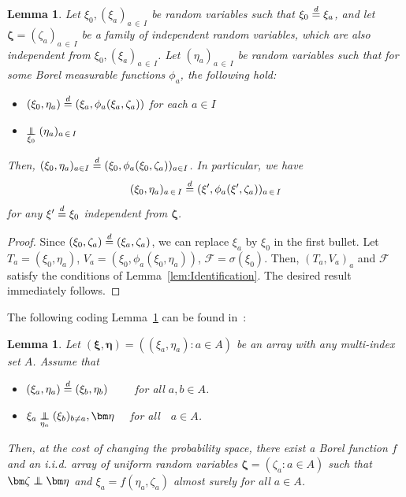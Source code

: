 \documentclass[10pt]{amsart}
\newtheorem{lemm}[theo]{Lemma}\newtheorem{prop}[theo]{Proposition}\newtheorem{coro}[theo]{Corollary}\newtheorem{conj}[theo]{Conjecture}
\theoremstyle{definition}\newtheorem{defi}[theo]{Definition}\newtheorem{rema}[theo]{Remark}\newtheorem{exam}[theo]{Example}\newtheorem{exem}[theo]{Example}\newtheorem{nota}[theo]{Notation}
\newcommand{\independent}{\protect\mathpalette{\protect\independenT}{\perp}}\def\independenT#1#2{\mathrel{\rlap{$#1#2$}\mkern2mu{#1#2}}}
\renewcommand{\d}{\buildrel{d}\over{=}}
\newcommand*\FF{\mathcal{F}}
\begin{document}
\begin{lemm}\label{lem:joining}
Let $\xi_0, (\xi_a)_{a\,\in\,I}$ be random variables such that $\xi_0 \d \xi_a$, and let\linebreak$\bm{\zeta}=(\zeta_a)_{a\,\in\,I}$ be a family of independent random variables, which are also independent from $\xi_0, (\xi_a)_{a\,\in\,I}$. Let $(\eta_a)_{a\,\in\,I}$ be random variables such that for some Borel measurable functions $\phi_a$, the following hold:
\begin{itemize}
\item $(\xi_0,\eta_a) \d (\xi_a,\phi_a(\xi_a,\zeta_a))$ for each $a \in I$
\item $\underset{\xi_0}{\independent}(\eta_a)_{a\,\in \,I}$
\end{itemize}
Then, $(\xi_0,\eta_a)_{a\in I} \d (\xi_0,\phi_a(\xi_0,\zeta_a))_{a\in I}$. In particular, we have
\[
(\xi_0,\eta_a)_{a\,\in\,I} \d(\xi',\phi_a(\xi',\zeta_a))_{a\,\in\,I}
\]
for any $\xi'\d\xi_0$ independent from $\bm\zeta$.
\end{lemm}

\begin{proof}
Since $(\xi_0, \zeta_a) \d (\xi_a, \zeta_a)$, we can replace $\xi_a$ by $\xi_0$ in the first bullet. 
Let $T_a=(\xi_0, \eta_a)$, $V_a=(\xi_0, \phi_a(\xi_0, \eta_a))$, $\FF=\sigma(\xi_0)$. Then, $(T_a,V_a)_a$ and $\FF$ satisfy the conditions of Lemma~\ref{lem:Identification}. The desired result immediately follows.
\end{proof}


The following coding Lemma~\ref{lem: coding lemma} can be found in~\cite[Lemma~7.6]{kallenberg2006probabilistic}:


\goodbreak
\begin{lemm}\label{lem: coding lemma}
Let $(\bm\xi,\bm\eta)=((\xi_a,\eta_a):a \in A)$ be an array with any multi-index set $A$. Assume that
\begin{itemize}
\item $(\xi_a,\eta_a) \d (\xi_b,\eta_b)\qquad$ for all $a,b \in A$.
\item $\xi_a \underset{\eta_a}{\independent} (\xi_b)_{b \neq a}, \bm\eta\quad$ for all$\quad a\in A$.
\end{itemize}
Then, at the cost of changing the probability space, there exist a Borel function $f$ and an i.i.d. array of uniform random variables $\bm\zeta=(\zeta_a: a \in A)$ such that $\bm\zeta \independent \bm\eta$ and $\xi_a=f(\eta_a,\zeta_a)$ almost surely for all $a\in A$.
\end{lemm}
\end{document}
